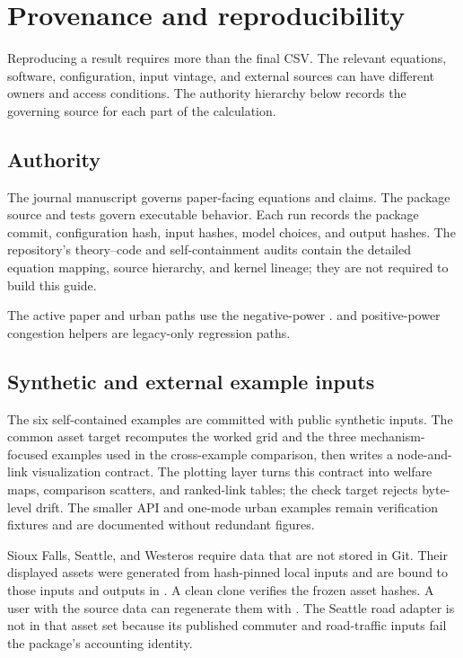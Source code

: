 \section{Provenance and reproducibility}
\label{app:provenance}

Reproducing a result requires more than the final CSV. The relevant equations,
software, configuration, input vintage, and external sources can have
different owners and access conditions. The authority hierarchy below records
the governing source for each part of the calculation.

\subsection{Authority}

The journal manuscript governs paper-facing equations and claims. The package
source and tests govern executable behavior. Each run records the package
commit, configuration hash, input hashes, model choices, and output hashes.
The repository's theory--code and self-containment audits contain the detailed
equation mapping, source hierarchy, and kernel lineage; they are not required
to build this guide.

The active paper and urban paths use the negative-power
.  and positive-power congestion helpers
are legacy-only regression paths.

\subsection{Synthetic and external example inputs}

The six self-contained examples are committed with public synthetic inputs.
The common asset target recomputes the worked grid and the three
mechanism-focused examples used in the cross-example comparison, then writes a
node-and-link visualization contract. The plotting layer turns this contract
into welfare maps, comparison scatters, and ranked-link tables; the check target
rejects byte-level drift. The smaller API and one-mode urban examples remain
verification fixtures and are documented without redundant figures.

Sioux Falls, Seattle, and Westeros require data that are not stored in Git.
Their displayed assets were generated from hash-pinned local inputs and are
bound to those inputs and outputs in
. A clean clone verifies the frozen asset
hashes. A user with the source data can regenerate them with
. The Seattle road adapter is not
in that asset set because its published commuter and road-traffic inputs fail
the package's accounting identity.

